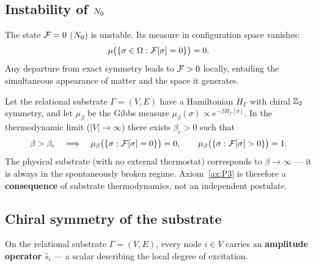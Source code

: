 \subsection{Instability of $N_0$}\label{ssec:niestabilnosc}

\begin{axiom}\label{ax:P3}
The state $\mathcal{F} = 0$ ($N_0$) is unstable.  Its measure in
configuration space vanishes:
\begin{equation}
    \mu\bigl(\{\sigma \in \Omega : \mathcal{F}[\sigma] = 0\}\bigr) = 0.
\end{equation}
Any departure from exact symmetry leads to $\mathcal{F} > 0$ locally,
entailing the simultaneous appearance of matter and the space it
generates.
\end{axiom}

\begin{proposition}%
\label{prop:P3-deriv}
Let the relational substrate $\Gamma = (V, E)$ have a Hamiltonian
$H_\Gamma$ with chiral $\mathbb{Z}_2$ symmetry, and let $\mu_\beta$ be the
Gibbs measure
$\mu_\beta(\sigma) \propto e^{-\beta H_\Gamma[\sigma]}$.
In the thermodynamic limit ($|V| \to \infty$) there exists
$\beta_c > 0$ such that
\begin{equation}
    \beta > \beta_c
    \quad\Longrightarrow\quad
    \mu_\beta\bigl(\{\sigma: \mathcal{F}[\sigma] = 0\}\bigr) = 0,
    \qquad
    \mu_\beta\bigl(\{\sigma: \mathcal{F}[\sigma] > 0\}\bigr) = 1.
\end{equation}
The physical substrate (with no external thermostat) corresponds to
$\beta \to \infty$ --- it is always in the spontaneously broken
regime.  Axiom~\ref{ax:P3} is therefore a \textbf{consequence} of
substrate thermodynamics, not an independent postulate.
\end{proposition}

\subsection{Chiral symmetry of the substrate}%
\label{ssec:chiralna}\label{ax:symmetry}

On the relational substrate $\Gamma = (V, E)$, every node
$i \in V$ carries an \textbf{amplitude operator} $\hat{s}_i$ ---
a scalar describing the local degree of excitation.

